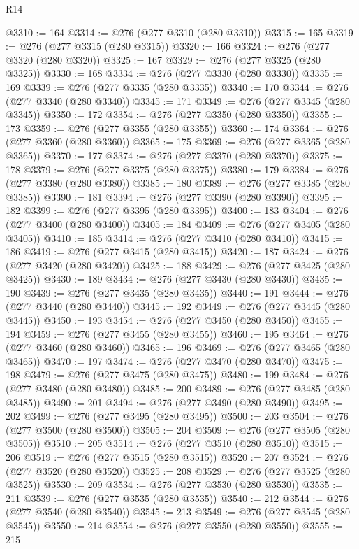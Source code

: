 \begin{lexlean}{R14}
\begin{coremodule}
@3310 := 164
@3314 := @276 (@277 @3310 (@280 @3310))
@3315 := 165
@3319 := @276 (@277 @3315 (@280 @3315))
@3320 := 166
@3324 := @276 (@277 @3320 (@280 @3320))
@3325 := 167
@3329 := @276 (@277 @3325 (@280 @3325))
@3330 := 168
@3334 := @276 (@277 @3330 (@280 @3330))
@3335 := 169
@3339 := @276 (@277 @3335 (@280 @3335))
@3340 := 170
@3344 := @276 (@277 @3340 (@280 @3340))
@3345 := 171
@3349 := @276 (@277 @3345 (@280 @3345))
@3350 := 172
@3354 := @276 (@277 @3350 (@280 @3350))
@3355 := 173
@3359 := @276 (@277 @3355 (@280 @3355))
@3360 := 174
@3364 := @276 (@277 @3360 (@280 @3360))
@3365 := 175
@3369 := @276 (@277 @3365 (@280 @3365))
@3370 := 177
@3374 := @276 (@277 @3370 (@280 @3370))
@3375 := 178
@3379 := @276 (@277 @3375 (@280 @3375))
@3380 := 179
@3384 := @276 (@277 @3380 (@280 @3380))
@3385 := 180
@3389 := @276 (@277 @3385 (@280 @3385))
@3390 := 181
@3394 := @276 (@277 @3390 (@280 @3390))
@3395 := 182
@3399 := @276 (@277 @3395 (@280 @3395))
@3400 := 183
@3404 := @276 (@277 @3400 (@280 @3400))
@3405 := 184
@3409 := @276 (@277 @3405 (@280 @3405))
@3410 := 185
@3414 := @276 (@277 @3410 (@280 @3410))
@3415 := 186
@3419 := @276 (@277 @3415 (@280 @3415))
@3420 := 187
@3424 := @276 (@277 @3420 (@280 @3420))
@3425 := 188
@3429 := @276 (@277 @3425 (@280 @3425))
@3430 := 189
@3434 := @276 (@277 @3430 (@280 @3430))
@3435 := 190
@3439 := @276 (@277 @3435 (@280 @3435))
@3440 := 191
@3444 := @276 (@277 @3440 (@280 @3440))
@3445 := 192
@3449 := @276 (@277 @3445 (@280 @3445))
@3450 := 193
@3454 := @276 (@277 @3450 (@280 @3450))
@3455 := 194
@3459 := @276 (@277 @3455 (@280 @3455))
@3460 := 195
@3464 := @276 (@277 @3460 (@280 @3460))
@3465 := 196
@3469 := @276 (@277 @3465 (@280 @3465))
@3470 := 197
@3474 := @276 (@277 @3470 (@280 @3470))
@3475 := 198
@3479 := @276 (@277 @3475 (@280 @3475))
@3480 := 199
@3484 := @276 (@277 @3480 (@280 @3480))
@3485 := 200
@3489 := @276 (@277 @3485 (@280 @3485))
@3490 := 201
@3494 := @276 (@277 @3490 (@280 @3490))
@3495 := 202
@3499 := @276 (@277 @3495 (@280 @3495))
@3500 := 203
@3504 := @276 (@277 @3500 (@280 @3500))
@3505 := 204
@3509 := @276 (@277 @3505 (@280 @3505))
@3510 := 205
@3514 := @276 (@277 @3510 (@280 @3510))
@3515 := 206
@3519 := @276 (@277 @3515 (@280 @3515))
@3520 := 207
@3524 := @276 (@277 @3520 (@280 @3520))
@3525 := 208
@3529 := @276 (@277 @3525 (@280 @3525))
@3530 := 209
@3534 := @276 (@277 @3530 (@280 @3530))
@3535 := 211
@3539 := @276 (@277 @3535 (@280 @3535))
@3540 := 212
@3544 := @276 (@277 @3540 (@280 @3540))
@3545 := 213
@3549 := @276 (@277 @3545 (@280 @3545))
@3550 := 214
@3554 := @276 (@277 @3550 (@280 @3550))
@3555 := 215

\end{coremodule}
\end{lexlean}
